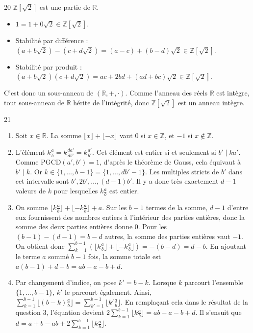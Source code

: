\begin{correction}{20}
$\mathbb{Z}[\sqrt{2}]$ est une partie de $\mathbb{R}$. 
\begin{itemize}
 \item $1 = 1 + 0\sqrt{2} \in \mathbb{Z}[\sqrt{2}]$. 
 \item Stabilité par différence : $(a+b\sqrt{2}) - (c+d\sqrt{2}) = (a-c) + (b-d)\sqrt{2} \in \mathbb{Z}[\sqrt{2}]$. 
 \item Stabilité par produit : $(a+b\sqrt{2})(c+d\sqrt{2}) = ac + 2bd + (ad+bc)\sqrt{2} \in \mathbb{Z}[\sqrt{2}]$. 
\end{itemize}
C'est donc un sous-anneau de $(\mathbb{R}, +, \cdot)$. 
Comme l'anneau des réels $\mathbb{R}$ est intègre, tout sous-anneau de $\mathbb{R}$ hérite de l'intégrité, donc $\mathbb{Z}[\sqrt{2}]$ est un anneau intègre. 
\end{correction}

\begin{correction}{21}
\begin{enumerate}
 \item Soit $x \in \mathbb{R}$. La somme $\lfloor x \rfloor + \lfloor -x \rfloor$ vaut $0$ si $x \in \mathbb{Z}$, et $-1$ si $x \notin \mathbb{Z}$. 
 \item L'élément $k\frac{a}{b} = k\frac{da'}{db'} = k\frac{a'}{b'}$. Cet élément est entier si et seulement si $b' \mid k a'$. 
 Comme $\text{PGCD}(a',b')=1$, d'après le théorème de Gauss, cela équivaut à $b' \mid k$. 
 Or $k \in \{1, \dots, b-1\} = \{1, \dots, db'-1\}$. Les multiples stricts de $b'$ dans cet intervalle sont $b', 2b', \dots, (d-1)b'$. 
 Il y a donc très exactement $d-1$ valeurs de $k$ pour lesquelles $k\frac{a}{b}$ est entier. 
 \item On somme $\lfloor k\frac{a}{b} \rfloor + \lfloor -k\frac{a}{b} \rfloor + a$.
 Sur les $b-1$ termes de la somme, $d-1$ d'entre eux fournissent des nombres entiers à l'intérieur des parties entières, donc la somme des deux parties entières donne 0. Pour les $(b-1)-(d-1) = b-d$ autres, la somme des parties entières vaut $-1$. 
 On obtient donc $\sum_{k=1}^{b-1} \left( \lfloor k\frac{a}{b} \rfloor + \lfloor -k\frac{a}{b} \rfloor \right) = - (b-d) = d-b$. 
 En ajoutant le terme $a$ sommé $b-1$ fois, la somme totale est $a(b-1) + d - b = ab - a - b + d$. 
 \item Par changement d'indice, on pose $k' = b-k$. Lorsque $k$ parcourt l'ensemble $\{1, \dots, b-1\}$, $k'$ le parcourt également. 
 Ainsi, $\sum_{k=1}^{b-1} \lfloor (b-k)\frac{a}{b} \rfloor = \sum_{k'=1}^{b-1} \lfloor k'\frac{a}{b} \rfloor$. 
 En remplaçant cela dans le résultat de la question 3, l'équation devient $2 \sum_{k=1}^{b-1} \lfloor k\frac{a}{b} \rfloor = ab - a - b + d$. 
 Il s'ensuit que $d = a + b - ab + 2 \sum_{k=1}^{b-1} \lfloor k\frac{a}{b} \rfloor$. 
\end{enumerate}
\end{correction}

